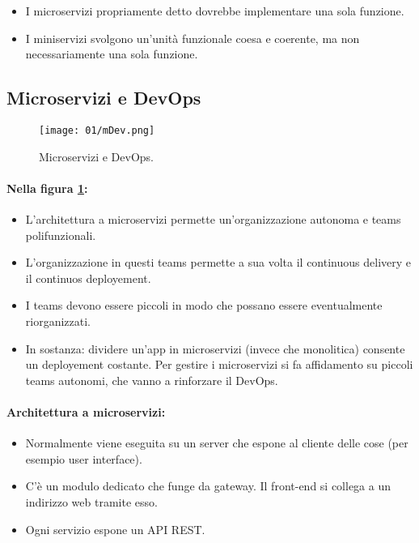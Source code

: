 \begin{itemize}
	\item I microservizi propriamente detto dovrebbe implementare una sola funzione.
	\item I miniservizi svolgono un'unità funzionale coesa e coerente, ma non necessariamente una sola funzione.
\end{itemize}


\subsection{Microservizi e DevOps}

\begin{figure}[h]
	\centering
	\texttt{[image: 01/mDev.png]}
	\caption{Microservizi e DevOps.}
	\label{fig:mDev}
\end{figure}

\paragraph{Nella figura \ref{fig:mDev}:}

\begin{itemize}
	\item L'architettura a microservizi permette un'organizzazione autonoma e teams polifunzionali.
	\item L'organizzazione in questi teams permette a sua volta il continuous delivery e il continuos deployement.
	\item I teams devono essere piccoli in modo che possano essere eventualmente riorganizzati.
	\item In sostanza: dividere un'app in microservizi (invece che monolitica) consente un deployement costante. Per gestire i microservizi si fa affidamento su piccoli teams autonomi, che vanno a rinforzare il DevOps.
\end{itemize}


\paragraph{Architettura a microservizi:}

\begin{itemize}
	\item Normalmente viene eseguita su un server che espone al cliente delle cose (per esempio user interface).
	\item C'è un modulo dedicato che funge da gateway. Il front-end si collega a un indirizzo web tramite esso.
	\item Ogni servizio espone un API REST.
\end{itemize}

